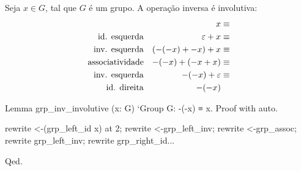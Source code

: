 \begin{minipage}[t]{0.5\linewidth}
\begin{corolario}
Seja $x \in G$, tal que $G$ é um grupo. A operação inversa é involutiva:
\begin{align*}
                               & & x& \equiv\\
   \text{\textup{id. esquerda}}& & \varepsilon + x& \equiv\\
   \text{\textup{inv. esquerda}}& & (-(-x) + -x) + x& \equiv\\
   \text{\textup{associatividade}}& & -(-x) + (-x + x)& \equiv\\
   \text{\textup{inv. esquerda}}& & -(-x) + \varepsilon& \equiv\\
   \text{\textup{id. direita}}& & -(-x) &
\end{align*}
\end{corolario}
\end{minipage}
\hspace{1em}
\begin{minipage}[t]{0.5\linewidth}
\begin{coqcode}
Lemma grp_inv_involutive
  (x: G) `{Group G}: -(-x) ≡ x.
Proof with auto.


rewrite <-(grp_left_id x) at 2;
rewrite <-grp_left_inv;
rewrite <-grp_assoc;
rewrite grp_left_inv;
rewrite grp_right_id...

Qed.
\end{coqcode}
\end{minipage}

